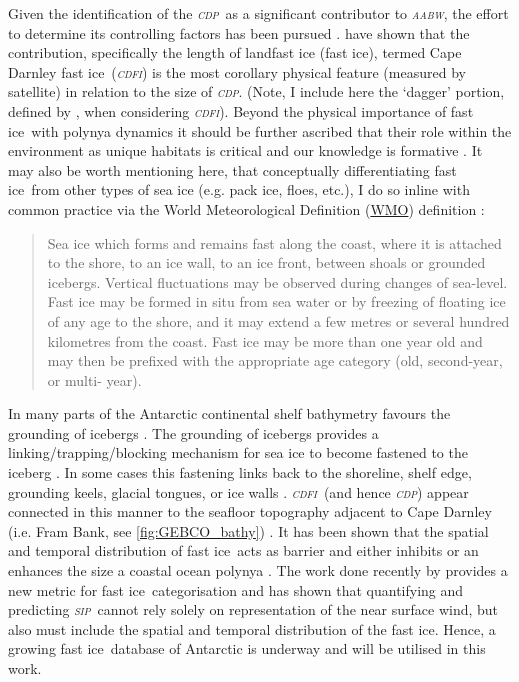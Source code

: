 \documentclass[11pt,a4paper]{article}
\newcommand{\sip}{\textit{\textsc{sip}}} %
\newcommand{\aabw}{\textit{\textsc{{aabw}}}} %
\newcommand{\cdp}{\textit{\textsc{{cdp}}}} %
\newcommand{\cdfi}{\textit{\textsc{{cdfi}}}}
\newcommand{\fastice}{fast ice}
\newcommand{\wmo}{\href{https://public.wmo.int/en}{\uppercase{wmo}}}
\begin{document}
Given the identification of the \cdp~as a significant contributor to \aabw, the
effort to determine its controlling factors has been pursued \citep{Nakayama2014,Liu2017}. \cite{Fraser2019}
have shown that the contribution, specifically the length of landfast ice (\fastice), termed Cape Darnley \fastice~(\cdfi) is the most corollary physical feature (measured by satellite) in relation to the size of \cdp. (Note, I
include here the `dagger' portion, defined by \cite{Fraser2019}, when
considering \cdfi). Beyond the physical importance of \fastice~with polynya
dynamics it should be further ascribed that their role within the environment as unique habitats
is critical and our knowledge is formative \citep{Trathan2011,Ainley2015}. It may also be worth mentioning here, that conceptually
differentiating \fastice~from other types of sea ice (e.g. pack
ice, floes, etc.), I do so inline with common practice via the World
Meteorological Definition (\wmo) definition \cite{WMOSeaIceNomenclature}:
\begin{quote}
  Sea ice which forms and remains fast along the coast, where it is attached to
  the shore, to an ice wall, to an ice front, between shoals or grounded
  icebergs. Vertical fluctuations may be observed during changes of sea-level.
  Fast ice may be formed in situ from sea water or by freezing of floating ice
  of any age to the shore, and it may extend a few metres or several hundred
  kilometres from the coast. Fast ice may be more than one year old and may then
  be prefixed with the appropriate age category (old, second-year, or multi-
  year).
\end{quote}

In many parts of the Antarctic continental shelf bathymetry favours the grounding of
icebergs \citep{Wesche2012}. The grounding of icebergs provides a linking/trapping/blocking
mechanism for sea ice to become fastened to the iceberg \citep{Massom2000,Fraser2019,Li2020}. In some cases this
fastening links back to the shoreline, shelf edge, grounding keels, glacial
tongues, or ice walls \citep{Massom1999,Fraser2012}.
\cdfi~(and hence \cdp) appear connected in this manner to the seafloor topography
adjacent to Cape Darnley (i.e. Fram Bank, see \ref{fig:GEBCO_bathy}) \citep{Nakayama2014,Liu2017}. It has
been shown that the spatial and temporal distribution of \fastice~acts as
barrier and either inhibits or an enhances the size a coastal ocean polynya \citep{Massom2001,Ohshima2013,Nakayama2014,Nihashi2015,Kusahara2017a,Fraser2019}.
The work done recently by \cite{Fraser2019} provides a new metric for
\fastice~categorisation and has shown that quantifying and predicting
\sip~cannot rely solely on representation of the near surface wind, but also
must include the spatial and temporal distribution of the \fastice. Hence, a
growing \fastice~database of Antarctic is underway \citep{Fraser2020} and will
be utilised in this work.
\end{document}

